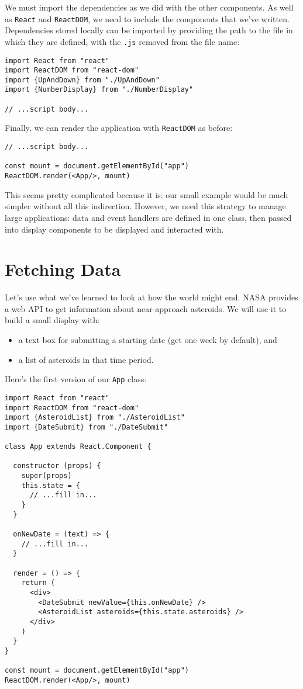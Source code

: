 We must import the dependencies as we did with the other components.
As well as \texttt{React} and \texttt{ReactDOM},
we need to include the components that we've written.
Dependencies stored locally can be imported by providing the path to
the file in which they are defined,
with the \texttt{.js} removed from the file name:

\begin{verbatim}
import React from "react"
import ReactDOM from "react-dom"
import {UpAndDown} from "./UpAndDown"
import {NumberDisplay} from "./NumberDisplay"

// ...script body...
\end{verbatim}

Finally,
we can render the application with \texttt{ReactDOM} as before:

\begin{verbatim}
// ...script body...

const mount = document.getElementById("app")
ReactDOM.render(<App/>, mount)
\end{verbatim}

This seems pretty complicated because it is:
our small example would be much simpler without all this indirection.
However,
we need this strategy to manage large applications:
data and event handlers are defined in one class,
then passed into display components to be displayed and interacted with.

\section{Fetching Data}\label{s:interactive-fetching}

Let's use what we've learned to look at how the world might end.
NASA provides a web API to get information about near-approach asteroids.
We will use it to build a small display with:

\begin{itemize}
\item
  a text box for submitting a starting date (get one week by default), and
\item
  a list of asteroids in that time period.
\end{itemize}

Here's the first version of our \texttt{App} class:

\begin{verbatim}
import React from "react"
import ReactDOM from "react-dom"
import {AsteroidList} from "./AsteroidList"
import {DateSubmit} from "./DateSubmit"

class App extends React.Component {

  constructor (props) {
    super(props)
    this.state = {
      // ...fill in...
    }
  }

  onNewDate = (text) => {
    // ...fill in...
  }

  render = () => {
    return (
      <div>
        <DateSubmit newValue={this.onNewDate} />
        <AsteroidList asteroids={this.state.asteroids} />
      </div>
    )
  }
}

const mount = document.getElementById("app")
ReactDOM.render(<App/>, mount)
\end{verbatim}

